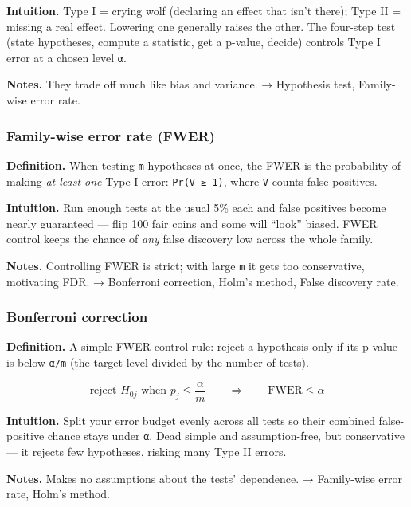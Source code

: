 \documentclass[
  10pt,
  letterpaper,
  onecolumn]{article}
\begin{document}
\textbf{Intuition.} Type I = crying wolf (declaring an effect that isn't
there); Type II = missing a real effect. Lowering one generally raises
the other. The four-step test (state hypotheses, compute a statistic,
get a p-value, decide) controls Type I error at a chosen level
\texttt{α}.

\textbf{Notes.} They trade off much like bias and variance. → Hypothesis
test, Family-wise error rate.

\hypertarget{family-wise-error-rate-fwer}{%
\subsubsection{Family-wise error rate
(FWER)}\label{family-wise-error-rate-fwer}}

\textbf{Definition.} When testing \texttt{m} hypotheses at once, the
FWER is the probability of making \emph{at least one} Type I error:
\texttt{Pr(V\ ≥\ 1)}, where \texttt{V} counts false positives.

\textbf{Intuition.} Run enough tests at the usual 5\% each and false
positives become nearly guaranteed --- flip 100 fair coins and some will
``look'' biased. FWER control keeps the chance of \emph{any} false
discovery low across the whole family.

\textbf{Notes.} Controlling FWER is strict; with large \texttt{m} it
gets too conservative, motivating FDR. → Bonferroni correction, Holm's
method, False discovery rate.

\hypertarget{bonferroni-correction}{%
\subsubsection{Bonferroni correction}\label{bonferroni-correction}}

\textbf{Definition.} A simple FWER-control rule: reject a hypothesis
only if its p-value is below \texttt{α/m} (the target level divided by
the number of tests).

\begin{equation*}
\text{reject }H_{0j}\text{ when } p_j\le \frac{\alpha}{m}
\qquad\Longrightarrow\qquad \mathrm{FWER}\le\alpha
\end{equation*}

\textbf{Intuition.} Split your error budget evenly across all tests so
their combined false-positive chance stays under \texttt{α}. Dead simple
and assumption-free, but conservative --- it rejects few hypotheses,
risking many Type II errors.

\textbf{Notes.} Makes no assumptions about the tests' dependence. →
Family-wise error rate, Holm's method.
\end{document}
